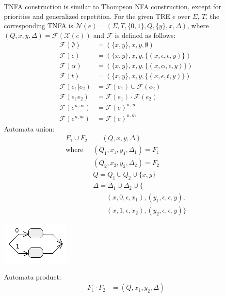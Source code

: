 \documentclass{article}
\newcommand{\Xeq}{\!=\!}
\newcommand{\XF}{\mathcal{F}}
\newcommand{\XN}{\mathcal{N}}
\newcommand{\XX}{\mathcal{X}}
\theoremstyle{definition}
\begin{document}
\begin{multicols}{2}
TNFA construction is similar to Thompson NFA construction,
except for priorities and generalized repetition.
For the given TRE $e$ over $\Sigma$, $T$, the corresponding TNFA is $\XN(e) \Xeq (\Sigma, T, \{0, 1\}, Q, \{ y \}, x, \Delta)$,
where $(Q, x, y, \Delta) \Xeq \XF(\XX(e))$ and $\XF$ is defined as follows:
    \begin{align*}
        \XF(\emptyset) &= (\{ x, y \}, x, y, \emptyset) \\
        \XF(\epsilon) &= (\{ x, y \}, x, y, \{ (x, \epsilon, \epsilon, y) \}) \\
        \XF(\alpha) &= (\{ x, y \}, x, y, \{ (x, \alpha, \epsilon, y) \}) \\
        \XF(t) &= (\{ x, y \}, x, y, \{ (x, \epsilon, t, y) \}) \\
        \XF(e_1 | e_2) &= \XF(e_1) \cup \XF(e_2) \\
        \XF(e_1 e_2) &= \XF(e_1) \cdot \XF(e_2) \\
        \XF(e^{n,\infty}) &= \XF(e)^{n,\infty} \\
        \XF(e^{n,m}) &= \XF(e)^{n, m}
    \end{align*}
%
Automata union:
    \begin{align*}
        F_1 \cup F_2 &= (Q, x, y, \Delta) \\
        \text{where }
            & (Q_1, x_1, y_1, \Delta_1) = F_1 \\
            & (Q_2, x_2, y_2, \Delta_2) = F_2 \\
            & Q = Q_1 \cup Q_2 \cup \{ x, y \} \\
            & \Delta = \Delta_1 \cup \Delta_2 \cup \{ \\
                & \qquad (x, 0, \epsilon, x_1), (y_1, \epsilon, \epsilon, y), \\
                & \qquad (x, 1, \epsilon, x_2), (y_2, \epsilon, \epsilon, y) \}
    \end{align*}
%
\begin{center}
\includegraphics[width=0.3\linewidth]{img/tnfa/union.png}
\end{center}
%
Automata product:
    \begin{align*}
        F_1 \cdot F_2 &= (Q, x_1, y_2, \Delta) \\

\end{align*}
\end{multicols}
\end{document}
